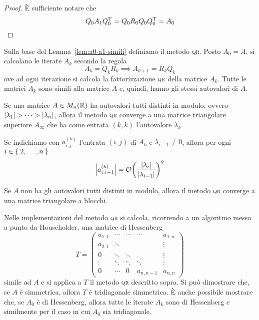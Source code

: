 	\begin{proof}
		È sufficiente notare che
		\begin{equation*}
			Q_0 A_1 Q_0^\mathrm{T}\relax = Q_0 R_0 Q_0 Q_0^\mathrm{T}\relax = A_0 \qedhere
		\end{equation*}
	\end{proof}

	Sulla base del Lemma~\ref{lem:a0-a1-simili} definiamo il metodo \textsc{qr}. Posto \(A_0 = A\), si calcolano le iterate \(A_k\) secondo la regola
	\begin{equation}
		A_k = Q_k R_k \implies A_{k + 1} = R_k Q_k
	\end{equation}
	ove ad ogni iterazione si calcola la fattorizzazione \textsc{qr} della matrice \(A_k\). Tutte le matrici \(A_k\) sono simili alla matrice \(A\) e, quindi, hanno gli stessi autovalori di \(A\).
	
	\begin{teorema}\label{th:metodo-qr-converge}
		Se una matrice \(A \in M_n (\mathbb{R})\) ha autovalori tutti distinti in modulo, ovvero \(\abs{\lambda_1} > \dots > \abs{\lambda_n}\), allora il metodo \textsc{qr} converge a una matrice triangolare superiore \(A_\infty\) che ha come entrata \((k, k)\) l'autovalore \(\lambda_k\).
		
		Se indichiamo con \(a_{i, j}^{(k)}\) l'entrata \((i, j)\) di \(A_k\) e \(\lambda_{i - 1} \ne 0\), allora per ogni \(i \in \Set{2, \dots, n}\)
		\begin{equation}\label{eq:metodo-qr-converge}
			\abs{a_{i, i - 1}^{(k)}} = \order{\frac{\abs{\lambda_i}}{\abs{\lambda_{i - 1}}}}^k
		\end{equation}
		
		Se \(A\) non ha gli autovalori tutti distinti in modulo, allora il metodo \textsc{qr} converge a una matrice triangolare a blocchi.
	\end{teorema}

	Nelle implementazioni del metodo \textsc{qr} si calcola, ricorrendo a un algoritmo messo a punto da Householder, una matrice di Hessenberg
	\begin{equation*}
		T =
		\begin{pmatrix}
			a_{1, 1} & \cdots & \cdots & \cdots       & a_{1, n} \\
			a_{2, 1} & \ddots &        &              & \vdots   \\
			0        & \ddots & \ddots &              & \vdots   \\
			\vdots   & \ddots & \ddots & \ddots       & \vdots   \\
			0        & \cdots & 0      & a_{n, n - 1} & a_{n, n}
		\end{pmatrix}
	\end{equation*}
	simile ad \(A\) e si applica a \(T\) il metodo \textsc{qr} descritto sopra. Si può dimostrare che, se \(A\) è simmetrica, allora \(T\) è tridiagonale simmetrica. È anche possibile mostrare che, se \(A_0\) è di Hessenberg, allora tutte le iterate \(A_k\) sono di Hessenberg e similmente per il caso in cui \(A_0\) sia tridiagonale.
	

